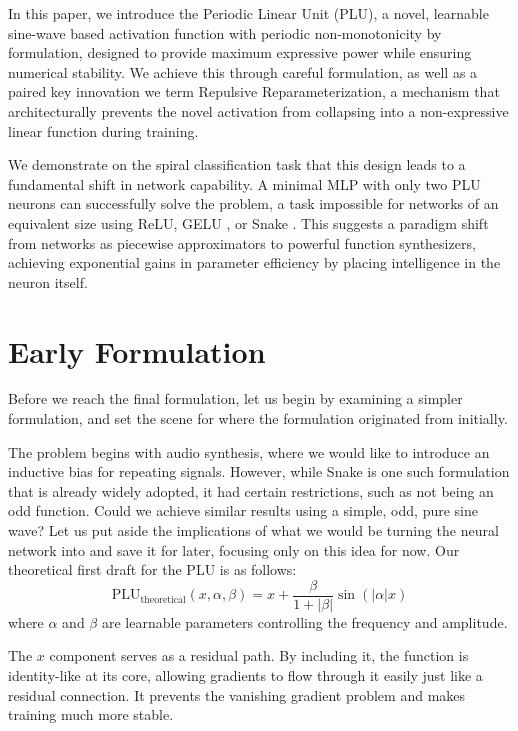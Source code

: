 \documentclass[11pt, letterpaper]{article}
\begin{document}
In this paper, we introduce the Periodic Linear Unit (PLU), a novel, learnable sine-wave based activation function with periodic non-monotonicity by formulation, designed to provide maximum expressive power while ensuring numerical stability. We achieve this through careful formulation, as well as a paired key innovation we term Repulsive Reparameterization, a mechanism that architecturally prevents the novel activation from collapsing into a non-expressive linear function during training.

We demonstrate on the spiral classification task that this design leads to a fundamental shift in network capability. A minimal MLP with only two PLU neurons can successfully solve the problem, a task impossible for networks of an equivalent size using ReLU, GELU \cite{hendrycks2016gaussianerrorlinearunits}, or Snake \cite{ziyin2020neuralnetworksfaillearn}. This suggests a paradigm shift from networks as piecewise approximators to powerful function synthesizers, achieving exponential gains in parameter efficiency by placing intelligence in the neuron itself.

\section{Early Formulation}

Before we reach the final formulation, let us begin by examining a simpler formulation, and set the scene for where the formulation originated from initially.

The problem begins with audio synthesis, where we would like to introduce an inductive bias for repeating signals. However, while Snake is one such formulation that is already widely adopted, it had certain restrictions, such as not being an odd function. Could we achieve similar results using a simple, odd, pure sine wave? Let us put aside the implications of what we would be turning the neural network into and save it for later, focusing only on this idea for now. Our theoretical first draft for the PLU is as follows:
\begin{equation}
    \text{PLU}_{\text{theoretical}}(x, \alpha, \beta) = x + \frac{\beta}{1 + \lvert\beta\rvert} \sin(\lvert\alpha\rvert x)
    \label{eq:plu_theoretical}
\end{equation}
where $\alpha$ and $\beta$ are learnable parameters controlling the frequency and amplitude.

The $x$ component serves as a residual path. By including it, the function is identity-like at its core, allowing gradients to flow through it easily just like a residual connection. It prevents the vanishing gradient problem and makes training much more stable.
\end{document}
